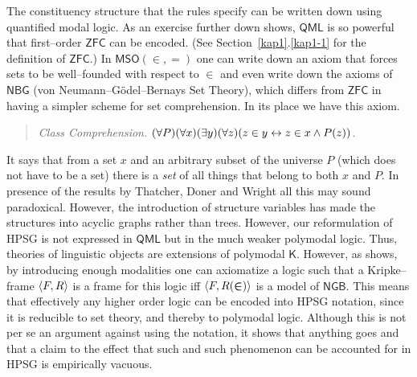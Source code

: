 The constituency structure that the rules specify can be written
down using quantified modal logic. As an exercise further down
shows, $\mathsf{QML}$ is so powerful that first--order $\mathsf{ZFC}$ can 
be encoded. (See Section~\ref{kap1}.\ref{kap1-1} for the definition 
of $\mathsf{ZFC}$.) 
In $\mathsf{MSO}(\boldsymbol{\in}, \boldsymbol{=})$ one can 
write down an axiom that forces sets to be well--founded with 
respect to $\in$ and even write down the axioms of $\mathsf{NBG}$ 
(von Neumann--G\"odel--Bernays Set Theory), which differs from 
$\mathsf{ZFC}$ in having a simpler scheme for set comprehension. In 
its place we have this axiom.
\begin{quote}
{\sl Class Comprehension.} $(\forall P)(\forall x)(\exists y)(%
    \forall z)(z \in y \dpf z \in x \und P(z))$.
\end{quote}
It says that from a set $x$ and an arbitrary subset of the
universe $P$ (which does not have to be a set)  there is a {\it
set\/} of all things that belong to both $x$ and $P$. In presence
of the results by Thatcher, Doner and Wright all this may sound
paradoxical. However, the introduction of structure variables has
made the structures into acyclic graphs rather than trees.
However, our reformulation of HPSG is not expressed in $\mathsf{QML}$
but in the much weaker polymodal logic. Thus, theories of
linguistic objects are extensions of polymodal $\mathsf{K}$. However,
as \cite{kracht:kuznetsov} 
shows, by introducing enough
modalities one can axiomatize a logic such that a Kripke--frame
$\langle F, R\rangle$ is a frame for this logic iff $\langle F,
R(\boldsymbol{\in})\rangle$ is a model of $\mathsf{NGB}$. This means that 
effectively any higher order logic can be encoded into HPSG notation, 
since it is reducible to set theory, and thereby to polymodal logic. 
Although this is not per se an argument against using the notation, it
shows that anything goes and that a claim to the effect that such
and such phenomenon can be accounted for in HPSG is empirically
vacuous.

